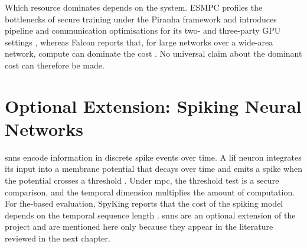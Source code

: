 Which resource dominates depends on the system. ESMPC profiles the bottlenecks of secure training under the Piranha framework and introduces pipeline and communication optimisations for its two- and three-party GPU settings \cite{yang2025esmpc}, whereas Falcon reports that, for large networks over a wide-area network, compute can dominate the cost \cite{wagh2021falcon}. No universal claim about the dominant cost can therefore be made.

\section{Optional Extension: Spiking Neural Networks}\label{sec:bg-snn}
\acp{snn} encode information in discrete spike events over time. A \ac{lif} neuron integrates its input into a membrane potential that decays over time and emits a spike when the potential crosses a threshold \cite{aribe2025snn}. Under \ac{mpc}, the threshold test is a secure comparison, and the temporal dimension multiplies the amount of computation. For \ac{fhe}-based evaluation, SpyKing reports that the cost of the spiking model depends on the temporal sequence length \cite{nikfam2025spyking}. \acp{snn} are an optional extension of the project and are mentioned here only because they appear in the literature reviewed in the next chapter.

